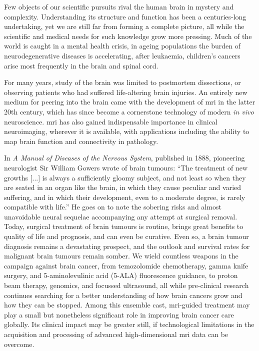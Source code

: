 \documentclass[12pt,phd,a4paper,twoside]{ucl_thesis}
\begin{document}
Few objects of our scientific pursuits rival the human brain in mystery and complexity.
Understanding its structure and function has been a centuries-long undertaking, yet we are still far from forming a complete picture, all while the scientific and medical needs for such knowledge grow more pressing.
Much of the world is caught in a mental health crisis\autocite{Patel2018,Liu2020,Yang2021a}, in ageing populations the burden of neurodegenerative diseases is accelerating\autocite{Deuschl2020,Li2022}, after leukaemia, children's cancers arise most frequently in the brain and spinal cord\autocite{Ostrom2015}.

For many years, study of the brain was limited to postmortem dissections, or observing patients who had suffered life-altering brain injuries.
An entirely new medium for peering into the brain came with the development of \gls{mri} in the latter 20th century, which has since become a cornerstone technology of modern \textit{in vivo} neuroscience.
\Gls{mri} has also gained indispensable importance in clinical neuroimaging, wherever it is available\autocite{Geethanath2019}, with applications including the ability to map brain function and connectivity in pathology.

In \textit{A Manual of Diseases of the Nervous System}, published in 1888, pioneering neurologist Sir William Gowers wrote of brain tumours:
``The treatment of new growths [...] is always a sufficiently gloomy subject, and not least so when they are seated in an organ like the brain, in which they cause peculiar and varied suffering, and in which their development, even to a moderate degree, is rarely compatible with life.''\autocite{Gowers1888}
He goes on to note the sobering risks and almost unavoidable neural sequelae accompanying any attempt at surgical removal.
Today, surgical treatment of brain tumours is routine, brings great benefits to quality of life and prognosis, and can even be curative.
Even so, a brain tumour diagnosis remains a devastating prospect, and the outlook and survival rates for malignant brain tumours remain somber\autocite{Aldape2019}.
We wield countless weapons in the campaign against brain cancer, from temozolomide chemotherapy, gamma knife surgery, and 5-aminolevulinic acid (5-ALA) fluorescence guidance, to proton beam therapy, genomics, and focussed ultrasound, all while pre-clinical research continues searching for a better understanding of how brain cancers grow and how they can be stopped.
Among this ensemble cast, \gls{mri}-guided treatment may play a small but nonetheless significant role in improving brain cancer care globally.
Its clinical impact may be greater still, if technological limitations in the acquisition and processing of advanced high-dimensional \gls{mri} data can be overcome.
\end{document}
